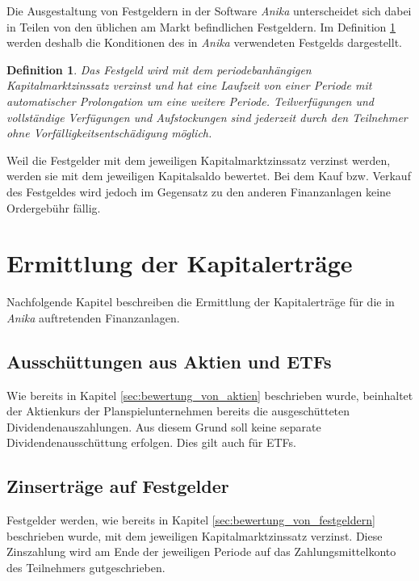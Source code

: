 \documentclass[12pt, a4paper]{article}
\theoremstyle{plain}
\newtheorem{definition}{Definition}
\begin{document}
Die Ausgestaltung von Festgeldern in der Software \textit{Anika} unterscheidet sich dabei in Teilen von den üblichen am Markt befindlichen Festgeldern. Im Definition \ref{def:festgeld} werden deshalb die Konditionen des in \textit{Anika} verwendeten Festgelds dargestellt.

\begin{definition}
	\label{def:festgeld}
	Das Festgeld wird mit dem periodebanhängigen Kapitalmarktzinssatz verzinst und hat eine Laufzeit von einer Periode mit automatischer Prolongation um eine weitere Periode. Teilverfügungen und vollständige Verfügungen und Aufstockungen sind jederzeit durch den Teilnehmer ohne Vorfälligkeitsentschädigung möglich. 
\end{definition}

Weil die Festgelder mit dem jeweiligen Kapitalmarktzinssatz verzinst werden, werden sie mit dem jeweiligen Kapitalsaldo bewertet. Bei dem Kauf bzw. Verkauf des Festgeldes wird jedoch im Gegensatz zu den anderen Finanzanlagen keine Ordergebühr fällig.

\section{Ermittlung der Kapitalerträge}
\label{sec:ermittlung_von_wertpapierertraegen}

Nachfolgende Kapitel beschreiben die Ermittlung der Kapitalerträge für die in \textit{Anika} auftretenden Finanzanlagen.

\subsection{Ausschüttungen aus Aktien und ETFs}
\label{sec:ausschuettung_aus_aktie}
Wie bereits in Kapitel \ref{sec:bewertung_von_aktien} beschrieben wurde, beinhaltet der Aktienkurs der Planspielunternehmen bereits die ausgeschütteten Dividendenauszahlungen. Aus diesem Grund soll keine separate Dividendenausschüttung erfolgen. Dies gilt auch für \glspl{ETF}.

\subsection{Zinserträge auf Festgelder}
\label{sec:zinsertraege_auf_festgelder}
Festgelder werden, wie bereits in Kapitel \ref{sec:bewertung_von_festgeldern} beschrieben wurde, mit dem jeweiligen Kapitalmarktzinssatz verzinst. Diese Zinszahlung wird am Ende der jeweiligen Periode auf das Zahlungsmittelkonto des Teilnehmers gutgeschrieben.
\end{document}
